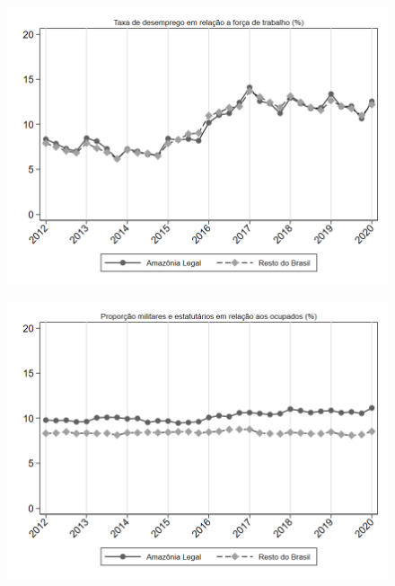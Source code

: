 \begin{frame}[label=_estrutura_emprego_taxa_de_desemprego]{}
\textit{\hyperlink{_estrutura_emprego}{}}
\begin{figure}
  \centering
  \includegraphics[width=1.0\linewidth]{../../analysis/output/estrutura_emprego/_estrutura_emprego_taxa_de_desemprego.png}
  \caption{}
  \label{fig:_estrutura_emprego_taxa_de_desemprego}
\end{figure}
\end{frame}

\begin{frame}[label=_estrutura_emprego_prop_militar]{}
\textit{\hyperlink{_estrutura_emprego}{}}
\begin{figure}
  \centering
  \includegraphics[width=1.0\linewidth]{../../analysis/output/estrutura_emprego/_estrutura_emprego_prop_militar.png}
  \caption{}
  \label{fig:_estrutura_emprego_prop_militar}
\end{figure}
\end{frame}


